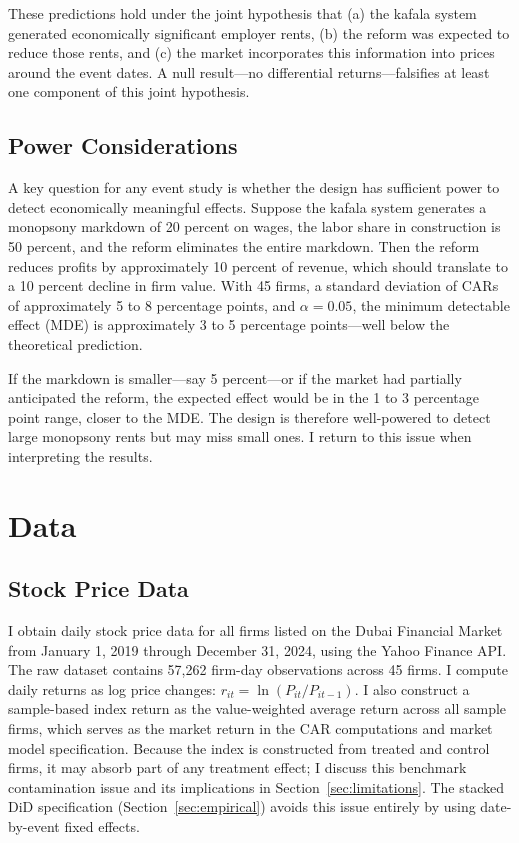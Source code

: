 \documentclass[12pt]{article}
\begin{document}
\noindent These predictions hold under the joint hypothesis that (a) the kafala system generated economically significant employer rents, (b) the reform was expected to reduce those rents, and (c) the market incorporates this information into prices around the event dates. A null result---no differential returns---falsifies at least one component of this joint hypothesis.

\subsection{Power Considerations}

A key question for any event study is whether the design has sufficient power to detect economically meaningful effects. Suppose the kafala system generates a monopsony markdown of 20 percent on wages, the labor share in construction is 50 percent, and the reform eliminates the entire markdown. Then the reform reduces profits by approximately 10 percent of revenue, which should translate to a 10 percent decline in firm value. With 45 firms, a standard deviation of CARs of approximately 5 to 8 percentage points, and $\alpha = 0.05$, the minimum detectable effect (MDE) is approximately 3 to 5 percentage points---well below the theoretical prediction.

If the markdown is smaller---say 5 percent---or if the market had partially anticipated the reform, the expected effect would be in the 1 to 3 percentage point range, closer to the MDE. The design is therefore well-powered to detect large monopsony rents but may miss small ones. I return to this issue when interpreting the results.



\section{Data}\label{sec:data}

\subsection{Stock Price Data}

I obtain daily stock price data for all firms listed on the Dubai Financial Market from January 1, 2019 through December 31, 2024, using the Yahoo Finance API. The raw dataset contains 57,262 firm-day observations across 45 firms. I compute daily returns as log price changes: $r_{it} = \ln(P_{it}/P_{it-1})$. I also construct a sample-based index return as the value-weighted average return across all sample firms, which serves as the market return in the CAR computations and market model specification. Because the index is constructed from treated and control firms, it may absorb part of any treatment effect; I discuss this benchmark contamination issue and its implications in Section~\ref{sec:limitations}. The stacked DiD specification (Section~\ref{sec:empirical}) avoids this issue entirely by using date-by-event fixed effects.
\end{document}
